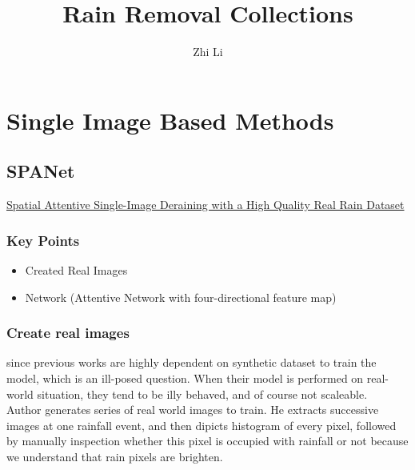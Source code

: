 \documentclass{article}
\begin{document}
\title{Rain Removal Collections}
\author{Zhi Li}
\maketitle
\section{Single Image Based Methods}
\subsection{SPANet}
\href{https://arxiv.org/pdf/1904.01538.pdf}{Spatial Attentive Single-Image Deraining with a High Quality Real Rain Dataset}
\subsubsection{Key Points}
\begin{itemize}
\item Created Real Images 
\item Network (Attentive Network with four-directional feature map)
\end{itemize}
\subsubsection{Create real images}
since previous works are highly dependent on synthetic dataset to train the model, which is an ill-posed question. When their model is performed on real-world situation, they tend to be illy behaved, and of course not scaleable.\\
Author generates series of real world images to train. He extracts successive images at one rainfall event, and then dipicts histogram of every pixel, followed by manually inspection whether this pixel is occupied with rainfall or not because we understand that rain pixels are brighten.\\ \bigskip
\end{document}
